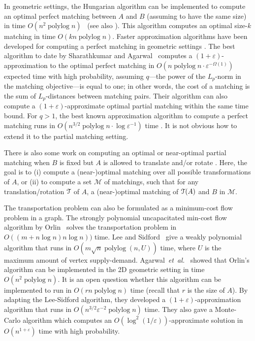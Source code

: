 \documentclass[a4paper,UKenglish]{socg-lipics-v2018}
\makeatletter
\def\note#1{\textcolor{red}{{#1}}}
\def\etal{\emph{et~al.}}
\def\etal{\textit{et~al.}}
\def\polylog{\mathop{\mathrm{polylog}}}
\def\eps{\varepsilon}
\theoremstyle{plain}
\numberwithin{figure}{section}
\def\n@te#1{\textsf{\boldmath \textbf{$\langle\!\langle$#1$\rangle\!\rangle$}}\leavevmode}
\def\note#1{\textcolor{red}{\n@te{#1}}}
\makeatother
\begin{document}
In geometric settings, the Hungarian algorithm can be implemented to compute
an optimal perfect matching between $A$ and $B$ (assuming to have the same size)
in time $O(n^2\polylog n)$~\cite{KMRSS17} (see also \cite{Vaidya89,AES99}).
This algorithm computes an optimal size-$k$ matching in time $O(kn\polylog n)$.
Faster approximation algorithms have been developed for computing a perfect
matching in geometric settings \cite{Vaidya89,V98,AV04,SA12}.
The best algorithm to date by Sharathkumar and Agarwal~\cite{SA12m}
computes a $(1+\eps)$-approximation to the optimal perfect matching in
$O(n\polylog n \cdot \eps^{-\Omega(1)})$ expected time with high probability,
assuming $q$---the power of the $L_p$-norm in the matching objective---is equal to one;
in other words, the cost of a matching is the sum of $L_p$-distances between
matching pairs.
Their algorithm can also compute a $(1+\eps)$-approximate optimal partial
matching within the same time bound.
For $q > 1$, the best known approximation algorithm to compute a perfect
matching runs in $O(n^{3/2}\polylog n \cdot \log\eps^{-1})$ time \cite{SA12}.
It is not obvious how to extend it to the partial matching setting.

There is also some work on computing an optimal or near-optimal partial
matching when $B$ is fixed but $A$ is allowed to translate and/or rotate
\cite{CGKR08,R10,AHJKRST18,AKKMRSX18}.
Here, the goal is to (i) compute a (near-)optimal matching over all possible
transformations of $A$, or (ii) to compute a set $\mathcal{M}$ of matchings,
such that for any translation/rotation $\EuScript{T}$ of $A$, a (near-)optimal
matching of $\EuScript{T}(A)$ and $B$ in $\mathcal{M}$.

The transportation problem can also be formulated as a minimum-cost flow
problem in a graph.
The strongly polynomial uncapacitated min-cost flow algorithm by
Orlin~\cite{O93} solves the transportation problem in
$O((m + n\log n)n\log n))$ time.
Lee and Sidford~\cite{LS13b} give a weakly polynomial algorithm that runs in
$O(m\sqrt{n}\polylog(n, U))$ time, where $U$ is the maximum amount of vertex supply-demand.
Agarwal~\etal~\cite{AFPVX17} showed that Orlin's algorithm can be
implemented in the 2D geometric setting in time $O(n^2\polylog n)$.
It is an open question whether this algorithm can be implemented to run in
$O(rn\polylog n)$ time (recall that $r$ is the size of $A$).
By adapting the Lee-Sidford algorithm, they developed a
$(1+\eps)$-approximation algorithm that runs in $O(n^{3/2}\eps^{-2}\polylog n)$ time.
They also gave a Monte-Carlo algorithm which computes an
$O(\log^2(1/\eps))$-approximate solution in $O(n^{1+\eps})$ time with
high probability.
\end{document}
